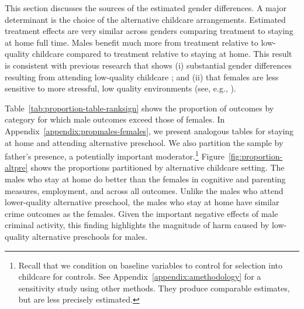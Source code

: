 This section discusses the sources of the estimated gender differences. A major determinant is the choice of the alternative childcare arrangements. Estimated treatment effects are very similar across genders comparing treatment to staying at home full time. Males benefit much more from treatment relative to low-quality childcare compared to treatment relative to staying at home. This result is consistent with previous research that shows (i) substantial gender differences resulting from attending low-quality childcare \citep{Kottelenberg-Lehrer_2014_Gender-Effects,Baker_Gruber_Milligan_2015_Noncog_Defects}; and (ii) that females are less sensitive to more stressful, low quality environments (see, e.g., \citealp{golding2016psychology,Autor-etal_2015_Family-Disadvantage}).

Table~\ref{tab:proportion-table-ranksign} shows the proportion of outcomes by category for which male outcomes exceed those of females. In Appendix~\ref{appendix:propmales-females}, we present analogous tables for staying at home and attending alternative preschool. We also partition the sample by father's presence, a potentially important moderator.\footnote{Recall that we condition on baseline variables to control for selection into childcare for controls. See Appendix~\ref{appendix:amethodology} for a sensitivity study using other methods. They produce comparable estimates, but are less precisely estimated.} Figure~\ref{fig:proportion-altpre} shows the proportions partitioned by alternative childcare setting. The males who stay at home do better than the females in cognitive and parenting measures, employment, and across all outcomes. Unlike the males who attend lower-quality alternative preschool, the males who stay at home have similar crime outcomes as the females. Given the important negative effects of male criminal activity, this finding highlights the magnitude of harm caused by low-quality alternative preschools for males.

